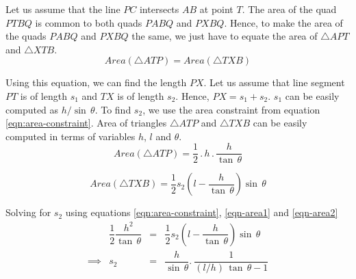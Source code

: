 Let us assume that the line $\mathit{PC}$ intersects $\mathit{AB}$ at point $\mathit{T}$. The area of the quad $\mathit{PTBQ}$ is common to both quads $\mathit{PABQ}$ and $\mathit{PXBQ}$. Hence, to make the area of the quads $\mathit{PABQ}$ and $\mathit{PXBQ}$ the same, we just have to equate the area of $\mathit{\bigtriangleup APT}$ and $\mathit{\bigtriangleup XTB}$.
\begin{equation}
    Area(\mathit{\bigtriangleup ATP}) = Area(\mathit{\bigtriangleup TXB})
    \label{eqn:area-constraint}
\end{equation}

Using this equation, we can find the length $\mathit{PX}$. Let us assume that line segment $\mathit{PT}$ is of length $s_1$ and $\mathit{TX}$ is of length $s_2$. Hence, $\mathit{PX = s_1 + s_2}$. $s_1$ can be easily computed as $h/\sin \, \theta$. To find $s_2$, we use the area constraint from equation \ref{eqn:area-constraint}. Area of triangles $\mathit{\bigtriangleup ATP}$ and $\mathit{\bigtriangleup TXB}$ can be easily computed in terms of variables $h$, $l$ and $\theta$.
\begin{equation}
    Area(\mathit{\bigtriangleup ATP}) = \dfrac{1}{2} \, . \,  h \, .  \, \dfrac{h}{\tan \, \theta}
    \label{eqn-area1}
\end{equation}

\begin{equation}
    Area(\mathit{\bigtriangleup TXB}) = \dfrac{1}{2} s_2 \left(l - \dfrac{h}{\tan \, \theta}\right) \sin \, \theta
    \label{eqn-area2}    
\end{equation}

Solving for $s_2$ using equations \ref{eqn:area-constraint}, \ref{eqn-area1} and \ref{eqn-area2}
\begin{equation}
\begin{array}{llcl}
     & \dfrac{1}{2} \dfrac{h^2}{\tan \, \theta}  & = & \dfrac{1}{2} s_2 \left(l - \dfrac{h}{\tan \, \theta} \right) \sin \, \theta  \\
    \implies & s_2& = & \dfrac{h}{\sin \, \theta} . \: \dfrac{1}{ (l/h)\, \tan \, \theta - 1}
\end{array}
\end{equation}


